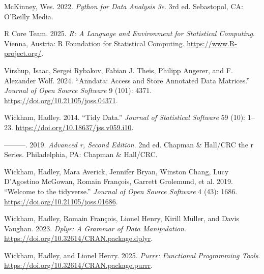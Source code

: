 \documentclass[
  letterpaper,
  DIV=11,
  numbers=noendperiod]{scrartcl}
\newlength{\cslhangindent}
\newenvironment{CSLReferences}[2] %
 {\begin{list}{}{%
  \setlength{\itemindent}{0pt}
  \setlength{\leftmargin}{0pt}
  \setlength{\parsep}{0pt}
  \ifodd #1
   \setlength{\leftmargin}{\cslhangindent}
   \setlength{\itemindent}{-1\cslhangindent}
  \fi
  \setlength{\itemsep}{#2\baselineskip}}}
 {\end{list}}
\begin{document}
\begin{CSLReferences}{1}{0}
McKinney, Wes. 2022. \emph{Python for Data Analysis 3e}. 3rd ed.
Sebastopol, CA: O'Reilly Media.

R Core Team. 2025. \emph{R: A Language and Environment for Statistical
Computing}. Vienna, Austria: R Foundation for Statistical Computing.
\url{https://www.R-project.org/}.

Virshup, Isaac, Sergei Rybakov, Fabian J. Theis, Philipp Angerer, and F.
Alexander Wolf. 2024. {``Anndata: Access and Store Annotated Data
Matrices.''} \emph{Journal of Open Source Software} 9 (101): 4371.
\url{https://doi.org/10.21105/joss.04371}.

Wickham, Hadley. 2014. {``Tidy Data.''} \emph{Journal of Statistical
Software} 59 (10): 1--23. \url{https://doi.org/10.18637/jss.v059.i10}.

---------. 2019. \emph{Advanced r, Second Edition}. 2nd ed. Chapman \&
Hall/CRC the r Series. Philadelphia, PA: Chapman \& Hall/CRC.

Wickham, Hadley, Mara Averick, Jennifer Bryan, Winston Chang, Lucy
D'Agostino McGowan, Romain François, Garrett Grolemund, et al. 2019.
{``Welcome to the {tidyverse}.''} \emph{Journal of Open Source Software}
4 (43): 1686. \url{https://doi.org/10.21105/joss.01686}.

Wickham, Hadley, Romain François, Lionel Henry, Kirill Müller, and Davis
Vaughan. 2023. \emph{Dplyr: A Grammar of Data Manipulation}.
\url{https://doi.org/10.32614/CRAN.package.dplyr}.

Wickham, Hadley, and Lionel Henry. 2025. \emph{Purrr: Functional
Programming Tools}. \url{https://doi.org/10.32614/CRAN.package.purrr}.

\end{CSLReferences}
\end{document}
